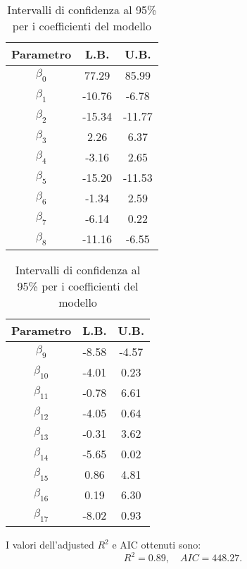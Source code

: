 \begin{table}[H]
	\centering
	\begin{minipage}{0.48\linewidth}
		\centering
		\begin{tabular}{|c|c|c|}
			\hline
			\textbf{Parametro} & \textbf{L.B.} & \textbf{U.B.} \\
			\hline
			$\beta_0$   & 77.29  & 85.99 \\
			$\beta_1$   & -10.76 & -6.78 \\
			$\beta_2$   & -15.34 & -11.77 \\
			$\beta_3$   & 2.26   & 6.37 \\
			$\beta_4$   & -3.16  & 2.65 \\
			$\beta_5$   & -15.20 & -11.53 \\
			$\beta_6$   & -1.34  & 2.59 \\
			$\beta_7$   & -6.14  & 0.22 \\
			$\beta_8$   & -11.16 & -6.55 \\
			\hline
		\end{tabular}
	\end{minipage}
	\hfill
	\begin{minipage}{0.48\linewidth}
		\centering
		\begin{tabular}{|c|c|c|}
			\hline
			\textbf{Parametro} & \textbf{L.B.} & \textbf{U.B.} \\
			\hline
			
			$\beta_9$   & -8.58  & -4.57 \\
			$\beta_{10}$ & -4.01  & 0.23 \\
			$\beta_{11}$ & -0.78  & 6.61 \\
			$\beta_{12}$ & -4.05  & 0.64 \\
			$\beta_{13}$ & -0.31  & 3.62 \\
			$\beta_{14}$ & -5.65  & 0.02 \\
			$\beta_{15}$ & 0.86   & 4.81 \\
			$\beta_{16}$ & 0.19   & 6.30 \\
			$\beta_{17}$ & -8.02  & 0.93 \\
			\hline
		\end{tabular}
	\end{minipage}
	\caption{Intervalli di confidenza al 95\% per i coefficienti del modello}
	\label{tab:ci_coefficienti}
\end{table}
I valori dell'adjusted $R^2$  e AIC ottenuti sono:
\begin{equation*}
	R^2 =      0.89, \quad AIC=448.27.
\end{equation*}

